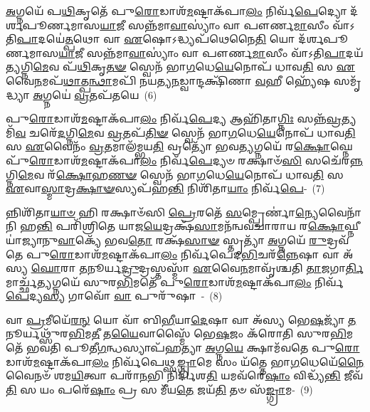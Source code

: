 \-\ul{𑌅}\-𑌗𑍍𑌨𑌯𑍇᳴ 𑌪\-\ul{𑌥𑌿}\-𑌕𑍃𑌤𑍇᳴ 𑌪𑍁\-\ul{𑌰𑍋}\-𑌡𑌾𑌶᳴\-\-\ul{𑌮}\-𑌷𑍍𑌟𑌾\-𑌕᳴𑌪𑌾\-\ul{𑌲𑌂} 𑌨𑌿𑌰𑍍𑌵᳴\-\ul{𑌪𑍇}\-𑌦𑍍𑌯𑍋 𑌦᳴𑌰𑍍\mbox{}𑌶𑌪𑍂𑌰𑍍𑌣𑌮𑌾𑌸\-\ul{𑌯𑌾}\-𑌜𑍀 𑌸𑌨𑍍𑌨᳴𑌮𑌾\-\ul{𑌵𑌾}\-𑌸𑍍𑌯𑌾𑌂॑ 𑌵𑌾 𑌪𑍗𑌰𑍍𑌣\-\ul{𑌮𑌾}\-𑌸𑍀𑌂 𑌵𑌾᳴\-𑌽𑌤𑌿\-\ul{𑌪𑌾}\-𑌦𑌯𑍇॑\-\ul{𑌤𑍍𑌪}\-𑌥𑍋 𑌵𑌾 \ul{𑌏}\-𑌷𑍋\-𑌽𑌦𑍍𑌧𑍍𑌯𑌪᳴𑌥𑍇𑌨𑍈\-\ul{𑌤𑌿} 𑌯𑍋 𑌦᳴𑌰𑍍\mbox{}𑌶𑌪𑍂𑌰𑍍𑌣𑌮𑌾𑌸\-\ul{𑌯𑌾}\-𑌜𑍀 𑌸𑌨𑍍𑌨᳴𑌮𑌾\-\ul{𑌵𑌾}\-𑌸𑍍𑌯𑌾𑌂॑ 𑌵𑌾 𑌪𑍗𑌰𑍍𑌣\-\ul{𑌮𑌾}\-𑌸𑍀𑌂 𑌵𑌾᳴\-𑌽𑌤𑌿\-\ul{𑌪𑌾}\-𑌦𑌯᳴\-\ul{𑌤𑍍𑌯}\-𑌗𑍍𑌨𑌿\-\ul{𑌮𑍇}\-𑌵 𑌪᳴\-\ul{𑌥𑌿}\-𑌕𑍃\-\ul{𑌤}\-\-\ul{𑍟} 𑌸𑍍𑌵𑍇𑌨᳴ 𑌭𑌾\-\ul{𑌗}\-𑌧𑍇\-\ul{𑌯𑍇}\-𑌨𑍋𑌪᳴ 𑌧𑌾𑌵\-\ul{𑌤𑌿} 𑌸 \ul{𑌏}\-𑌵𑍈\-\ul{𑌨}\-𑌮𑌪᳴\-\ul{𑌥𑌾}\-𑌤𑍍𑌪\-\ul{𑌨𑍍𑌥𑌾}\-𑌮𑌪𑌿᳴ 𑌨𑌯𑌤𑍍𑌯\-\ul{𑌨}\-𑌡𑍍𑌵𑌾𑌨𑍍𑌦𑌕𑍍𑌷𑌿᳴𑌣𑌾 \ul{𑌵}\-𑌹𑍀 𑌹𑍍𑌯𑍇᳴𑌷 𑌸𑌮𑍃᳴𑌦𑍍𑌧𑍍𑌯𑌾 \ul{𑌅}\-𑌗𑍍𑌨𑌯𑍇॑ \ul{𑌵𑍍𑌰}\-𑌤𑌪᳴𑌤𑌯𑍇~(6)

𑌪𑍁\-\ul{𑌰𑍋}\-𑌡𑌾𑌶᳴\-\-\ul{𑌮}\-𑌷𑍍𑌟𑌾\-𑌕᳴𑌪𑌾\-\ul{𑌲𑌂} 𑌨𑌿𑌰𑍍𑌵᳴\-\ul{𑌪𑍇}\-𑌦𑍍𑌯 𑌆𑌹𑌿᳴𑌤𑌾\-\ul{𑌗𑍍𑌨𑌿𑌃} 𑌸𑌨𑍍𑌨᳴\-\ul{𑌵𑍍𑌰}\-𑌤𑍍𑌯𑌮𑌿᳴\-\ul{𑌵} 𑌚𑌰𑍇᳴\-\ul{𑌦}\-𑌗𑍍𑌨𑌿\-\ul{𑌮𑍇}\-𑌵 \ul{𑌵𑍍𑌰}\-𑌤𑌪᳴\-\ul{𑌤𑌿}\-\-\ul{𑍟} 𑌸𑍍𑌵𑍇𑌨᳴ 𑌭𑌾\-\ul{𑌗}\-𑌧𑍇\-\ul{𑌯𑍇}\-𑌨𑍋𑌪᳴ 𑌧𑌾𑌵\-\ul{𑌤𑌿} 𑌸 \ul{𑌏}\-𑌵𑍈𑌨𑌂᳴ \ul{𑌵𑍍𑌰}\-𑌤𑌮𑌾𑌲᳴𑌮𑍍𑌭𑌯\-\ul{𑌤𑌿} 𑌵𑍍𑌰𑌤𑍍𑌯𑍋᳴ 𑌭𑌵\-\ul{𑌤𑍍𑌯}\-𑌗𑍍𑌨𑌯𑍇᳴ 𑌰\-\ul{𑌕𑍍𑌷𑍋}\-𑌘𑍍𑌨𑍇 𑌪𑍁᳴\-\ul{𑌰𑍋}\-𑌡𑌾𑌶᳴\-\ul{𑌮}\-𑌷𑍍𑌟𑌾\-𑌕᳴𑌪𑌾\-\ul{𑌲𑌂} 𑌨𑌿𑌰𑍍𑌵᳴\-\ul{𑌪𑍇}\-𑌦𑍍𑌯𑍞 𑌰𑌕𑍍𑌷𑌾𑍞᳴\-\ul{𑌸𑌿} 𑌸𑌚𑍇᳴𑌰\-\ul{𑌨𑍍𑌨}\-𑌗𑍍𑌨𑌿\-\ul{𑌮𑍇}\-𑌵 𑌰᳴\-\ul{𑌕𑍍𑌷𑍋}\-𑌹\-\ul{𑌣}\-\-\ul{𑍟} 𑌸𑍍𑌵𑍇𑌨᳴ 𑌭𑌾\-\ul{𑌗}\-𑌧𑍇\-\ul{𑌯𑍇}\-𑌨𑍋𑌪᳴ 𑌧𑌾𑌵\-\ul{𑌤𑌿} 𑌸 \ul{𑌏}\-𑌵𑌾\-\ul{𑌸𑍍𑌮𑌾}\-𑌦𑍍𑌰\-\ul{𑌕𑍍𑌷𑌾}\-\-\ul{𑍟}\-𑌸𑍍𑌯𑌪᳴\-𑌹\-\ul{𑌨𑍍𑌤𑌿} 𑌨𑌿𑌶𑌿᳴𑌤𑌾\-\ul{𑌯𑌾𑌂} 𑌨𑌿𑌰𑍍𑌵᳴\-\ul{𑌪𑍇}\--~(7)

𑌨𑍍𑌨𑌿𑌶𑌿᳴𑌤𑌾\-\ul{𑌯𑌾}\-\-\ul{𑍞} 𑌹𑌿 𑌰𑌕𑍍𑌷𑌾𑍞᳴𑌸𑌿 \ul{𑌪𑍍𑌰𑍇}\-𑌰𑌤𑍇᳴ \ul{𑌸}\-𑌮𑍍𑌪𑍍𑌰𑍇𑌰𑍍𑌣𑌾॑\-\ul{𑌨𑍍𑌯𑍇}\-𑌵𑍈𑌨𑌾᳴𑌨𑌿 𑌹\-\ul{𑌨𑍍𑌤𑌿} 𑌪𑌰𑌿᳴𑌶𑍍𑌰𑌿𑌤𑍇 𑌯𑌾𑌜\-\ul{𑌯𑍇}\-𑌦𑍍𑌰𑌕𑍍𑌷᳴\-\ul{𑌸𑌾}\-𑌮𑌨᳴𑌨𑍍𑌵𑌵𑌚𑌾𑌰𑌾𑌯 𑌰\-\ul{𑌕𑍍𑌷𑍋}\-𑌘𑍍𑌨𑍀 𑌯𑌾॑𑌜𑍍𑌯𑌾𑌨𑍁\-\ul{𑌵𑌾}\-𑌕𑍍𑌯𑍇᳴ 𑌭𑌵\-\ul{𑌤𑍋} 𑌰𑌕𑍍𑌷᳴\-\ul{𑌸𑌾}\-\-\ul{𑍟} 𑌸𑍍𑌤𑍃𑌤𑍍𑌯𑌾᳴ \ul{𑌅}\-𑌗𑍍𑌨𑌯𑍇᳴ \ul{𑌰𑍁}\-𑌦𑍍𑌰𑌵᳴𑌤𑍇 𑌪𑍁\-\ul{𑌰𑍋}\-𑌡𑌾𑌶᳴\-\-\ul{𑌮}\-𑌷𑍍𑌟𑌾\-𑌕᳴𑌪𑌾\-\ul{𑌲𑌂} 𑌨𑌿𑌰𑍍𑌵᳴𑌪𑍇𑌦\-\ul{𑌭𑌿}\-𑌚𑌰᳴\-\ul{𑌨𑍍𑌨𑍇}\-𑌷𑌾 𑌵𑌾 𑌅᳴𑌸𑍍𑌯 \ul{𑌘𑍋}\-𑌰𑌾 \ul{𑌤}\-𑌨𑍂𑌰𑍍𑌯\-\ul{𑌦𑍍𑌰𑍁}\-𑌦𑍍𑌰𑌸𑍍𑌤𑌸𑍍𑌮𑌾᳴ \ul{𑌏}\-𑌵𑍈\-\ul{𑌨}\-𑌮𑌾𑌵𑍃᳴𑌶𑍍𑌚𑌤𑌿 \ul{𑌤𑌾}\-𑌜𑌗𑌾\-\ul{𑌰𑍍𑌤𑌿}\-𑌮𑌾𑌰𑍍𑌚𑍍𑌛᳴\-\ul{𑌤𑍍𑌯}\-𑌗𑍍𑌨𑌯𑍇᳴ 𑌸𑍁𑌰\-\ul{𑌭𑌿}\-𑌮𑌤𑍇᳴ 𑌪𑍁\-\ul{𑌰𑍋}\-𑌡𑌾𑌶᳴\-\-\ul{𑌮}\-𑌷𑍍𑌟𑌾\-𑌕᳴𑌪𑌾\-\ul{𑌲𑌂} 𑌨𑌿𑌰𑍍𑌵᳴\-\ul{𑌪𑍇}\-𑌦𑍍𑌯\-\ul{𑌸𑍍𑌯} 𑌗𑌾𑌵𑍋᳴ \ul{𑌵𑌾} 𑌪𑍁𑌰𑍁᳴𑌷𑌾~-~(8)

𑌵𑌾 \ul{𑌪𑍍𑌰}\-𑌮𑍀𑌯𑍇᳴\-\ul{𑌰}\-\-\ul{𑌨𑍍} 𑌯𑍋 𑌵𑌾᳴ 𑌬𑌿\-\ul{𑌭𑍀}\-𑌯𑌾\-\ul{𑌦𑍇}\-𑌷𑌾 𑌵𑌾 𑌅᳴𑌸𑍍𑌯 𑌭𑍇\-\ul{𑌷}\-𑌜𑍍𑌯𑌾᳴ \ul{𑌤}\-𑌨𑍂𑌰𑍍𑌯𑌥𑍍𑌸𑍁᳴𑌰\-\ul{𑌭𑌿}\-𑌮\-\ul{𑌤𑍀} 𑌤\-\ul{𑌯𑍈}\-𑌵𑌾𑌸𑍍𑌮𑍈᳴ 𑌭𑍇\-\ul{𑌷}\-𑌜𑌂 𑌕᳴𑌰𑍋𑌤𑌿 𑌸𑍁𑌰\-\ul{𑌭𑌿}\-𑌮𑌤𑍇᳴ 𑌭𑌵𑌤𑌿 𑌪𑍂𑌤𑍀\-\ul{𑌗}\-𑌨𑍍𑌧𑌸𑍍𑌯𑌾𑌪᳴𑌹𑌤𑍍𑌯𑌾 \ul{𑌅}\-𑌗𑍍𑌨\-\ul{𑌯𑍇} 𑌕𑍍𑌷𑌾𑌮᳴𑌵𑌤𑍇 𑌪𑍁\-\ul{𑌰𑍋}\-𑌡𑌾𑌶᳴\-\-\ul{𑌮}\-𑌷𑍍𑌟𑌾\-𑌕᳴𑌪𑌾\-\ul{𑌲𑌂} 𑌨𑌿𑌰𑍍𑌵᳴𑌪𑍇𑌥𑍍𑌸\-\ul{𑌙𑍍𑌗𑍍𑌰𑌾}\-𑌮𑍇 𑌸𑌂 𑌯᳴𑌤𑍍𑌤𑍇 𑌭𑌾\-\ul{𑌗}\-𑌧𑍇𑌯𑍇᳴\-\ul{𑌨𑍈}\-𑌵𑍈𑌨𑍞᳴ 𑌶𑌮\-\ul{𑌯𑌿}\-𑌤𑍍𑌵𑌾 𑌪𑌰𑌾᳴\-\ul{𑌨}\-𑌭𑌿 𑌨𑌿𑌰𑍍𑌦𑌿᳴𑌶\-\ul{𑌤𑌿} 𑌯𑌮𑌵᳴𑌰𑍇\-\ul{𑌷𑌾𑌂} 𑌵𑌿𑌦𑍍𑌧𑍍𑌯᳴\-\ul{𑌨𑍍𑌤𑌿} 𑌜𑍀𑌵᳴\-\ul{𑌤𑌿} 𑌸 𑌯𑌂 𑌪𑌰𑍇᳴\-\ul{𑌷𑌾𑌂} 𑌪𑍍𑌰 𑌸 𑌮𑍀᳴𑌯\-\ul{𑌤𑍇} 𑌜𑌯᳴\-\ul{𑌤𑌿} 𑌤𑍞 𑌸᳴\-\ul{𑌙𑍍𑌗𑍍𑌰𑌾}\-𑌮-~(9)

